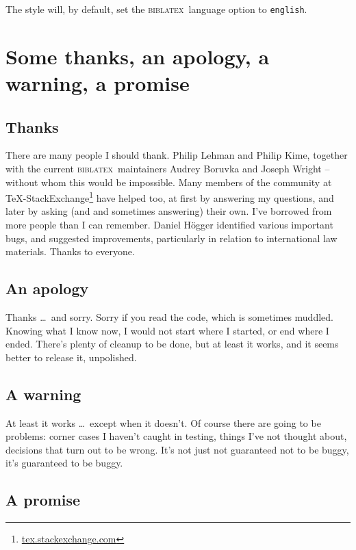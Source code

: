 \documentclass[a4paper,
               11pt,
	       DIV=1,			   
	       footinclude=false]
	      {scrartcl}
\newcommand{\biblatex}{\textsc{biblatex}}
\begin{document}
The style will, by default, set the \biblatex\ language option to
\texttt{english}.

\section{Some thanks, an apology, a warning, a promise}

\subsection{Thanks}

There are many people I should thank. Philip Lehman and Philip Kime,
together with the current \biblatex\ maintainers Audrey Boruvka and
Joseph Wright -- without whom this would be impossible. Many members
of the community at
\TeX-StackExchange\footnote{\url{tex.stackexchange.com}} have helped
too, at first by answering my questions, and later by asking (and and
sometimes answering) their own. I've borrowed from more people than I
can remember. Daniel H\"ogger identified various important bugs, and
suggested improvements, particularly in relation to international law
materials.  Thanks to everyone.

\subsection{An apology}

Thanks \ldots\ and sorry. Sorry if you read the code, which is
sometimes muddled. Knowing what I know now, I would not start where I
started, or end where I ended. There's plenty of cleanup to be done,
but at least it works, and it seems better to release it, unpolished.

\subsection{A warning}

At least it works \ldots\ except when it doesn't. Of course there are
going to be problems: corner cases I haven't caught in testing, things
I've not thought about, decisions that turn out to be wrong. It's not
just not guaranteed not to be buggy, it's guaranteed to be
buggy.

\subsection{A promise}
\end{document}
